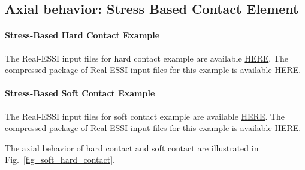 \subsection{ Axial behavior: Stress Based Contact Element}


\paragraph{Stress-Based Hard Contact Example}
The Real-ESSI input files for hard contact example are available 
\href{http://cml01.engr.ucdavis.edu/shortCourse/Day3/Contact_Examples/axial/HardContact_Elastic_Perfectly_Plastic_Shear_Model}{HERE}. 
The compressed package of Real-ESSI input files for this example is available 
\href{http://cml01.engr.ucdavis.edu/shortCourse/Day3/Contact_Examples/axial/HardContact_Elastic_Perfectly_Plastic_Shear_Model/HardContact_Elastic_Perfectly_Plastic_Shear_Model.tgz}{HERE}. 

\paragraph{Stress-Based Soft Contact Example}
The Real-ESSI input files for soft contact example are available 
\href{http://cml01.engr.ucdavis.edu/shortCourse/Day3/Contact_Examples/axial/SoftContact_Elastic_Perfectly_Plastic_Shear_Model}{HERE}. 
The compressed package of Real-ESSI input files for this example is available 
\href{http://cml01.engr.ucdavis.edu/shortCourse/Day3/Contact_Examples/axial/SoftContact_Elastic_Perfectly_Plastic_Shear_Model/SoftContact_Elastic_Perfectly_Plastic_Shear_Model.tgz}{HERE}. 


The axial behavior of hard contact and soft contact are illustrated in Fig.~\ref{fig_soft_hard_contact}.



